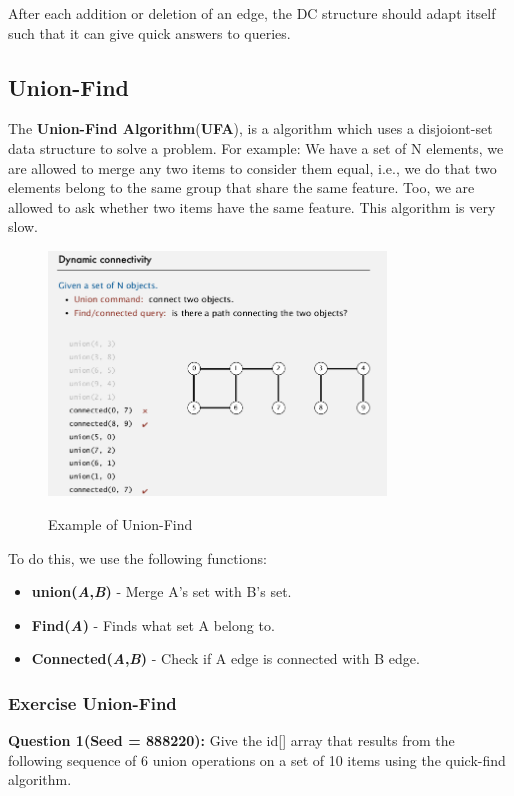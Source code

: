 \documentclass[paper=a4, fontsize=11pt]{scrartcl} %
\numberwithin{equation}{section} %
\numberwithin{figure}{section} %
\numberwithin{table}{section} %
\begin{document}
After each addition or deletion of an edge, the DC structure should adapt itself such that it can give quick answers to queries.

\subsection{Union-Find}

The \textbf{Union-Find Algorithm}(\textbf{UFA}), is a algorithm which uses a disjoiont-set data structure to solve a problem. For example: We have a set of N elements, we are allowed to merge any two items to consider them equal, i.e., we do that two elements belong to the same group that share the same feature. Too, we are allowed to ask whether two items have the same feature. This algorithm is very slow.

\begin{figure}[!h]
\centering
\includegraphics[width=0.8\textwidth]{images/Chapter1/Union-Find.png}
\label{fig:union-find1}
\caption{Example of Union-Find}
\end{figure}


To do this, we use the following functions:
\begin{itemize}
\item \textbf{union(\textit{A},\textit{B})} - Merge A's set with B's set.
\item \textbf{Find(\textit{A})} - Finds what set A belong to.
\item \textbf{Connected(\textit{A},\textit{B})} - Check if A edge is connected with B edge.
\end{itemize}

\subsubsection{Exercise Union-Find}
\textbf{Question 1(Seed = 888220):}
Give the id[] array that results from the following sequence of 6 union
operations on a set of 10 items using the quick-find algorithm.
\end{document}
